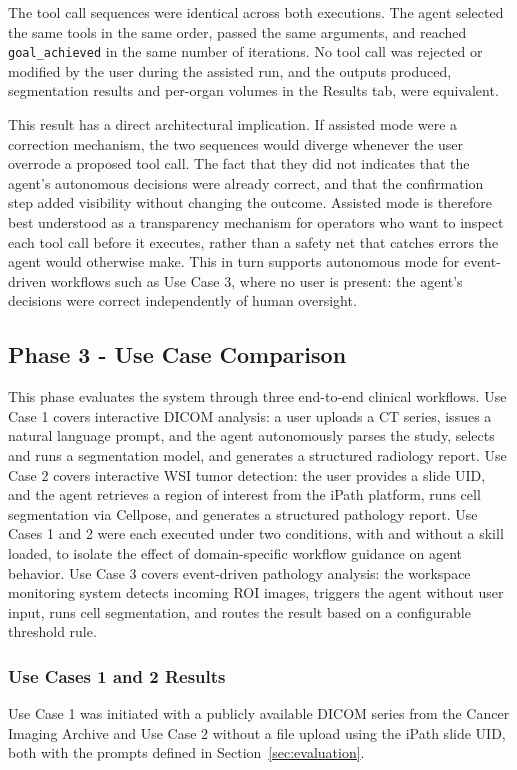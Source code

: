 \documentclass[conference]{IEEEtran}
\begin{document}
The tool call sequences were identical across both executions. The agent selected the same tools in the same order, passed the same arguments, and reached \texttt{goal\_achieved} in the same number of iterations. No tool call was rejected or modified by the user during the assisted run, and the outputs produced, segmentation results and per-organ volumes in the Results tab, were equivalent.

This result has a direct architectural implication. If assisted mode were a correction mechanism, the two sequences would diverge whenever the user overrode a proposed tool call. The fact that they did not indicates that the agent's autonomous decisions were already correct, and that the confirmation step added visibility without changing the outcome.
Assisted mode is therefore best understood as a transparency mechanism for operators who want to inspect each tool call before it executes, rather than a safety net that catches errors the agent would otherwise make.
This in turn supports autonomous mode for event-driven workflows such as Use Case 3, where no user is present: the agent's decisions were correct independently of human oversight.




\subsection{Phase 3 - Use Case Comparison}

This phase evaluates the system through three end-to-end clinical workflows. Use Case 1 covers interactive DICOM analysis: a user uploads a CT series, issues a natural language prompt, and the agent autonomously parses the study, selects and runs a segmentation model, and generates a structured radiology report. Use Case 2 covers interactive WSI tumor detection: the user provides a slide UID, and the agent retrieves a region of interest from the iPath platform, runs cell segmentation via Cellpose, and generates a structured pathology report. Use Cases 1 and 2 were each executed under two conditions, with and without a skill loaded, to isolate the effect of domain-specific workflow guidance on agent behavior. Use Case 3 covers event-driven pathology analysis: the workspace monitoring system detects incoming ROI images, triggers the agent without user input, runs cell segmentation, and routes the result based on a configurable threshold rule.

\subsubsection{Use Cases 1 and 2 Results}
Use Case 1 was initiated with a publicly available DICOM series from the Cancer Imaging Archive and Use Case 2 without a file upload using the iPath slide UID, both with the prompts defined in Section~\ref{sec:evaluation}.
\end{document}
